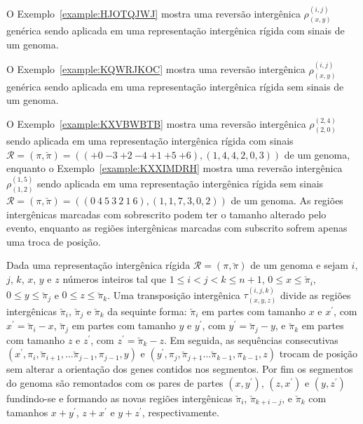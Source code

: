 O Exemplo~\ref{example:HJOTQJWJ} mostra uma reversão intergênica $\rho^{(i, j)}_{(x, y)}$ genérica sendo aplicada em uma representação intergênica rígida com sinais de um genoma.



O Exemplo~\ref{example:KQWRJKOC} mostra uma reversão intergênica $\rho^{(i, j)}_{(x, y)}$ genérica sendo aplicada em uma representação intergênica rígida sem sinais de um genoma.



O Exemplo~\ref{example:KXVBWBTB} mostra uma reversão intergênica $\rho^{(2,4)}_{(2,0)}$ sendo aplicada em uma representação intergênica rígida com sinais $\mathcal{R} = (\pi,\breve\pi) = \allowbreak(({+0}~{-3}~{+2}~{-4}~{+1}~{+5}~{+6}),\allowbreak(1,4,4,2,0,3))$ de um genoma, enquanto o Exemplo~\ref{example:KXXIMDRH} mostra uma reversão intergênica $\rho^{(1,5)}_{(1,2)}$ sendo aplicada em uma representação intergênica rígida sem sinais $\mathcal{R} = (\pi,\breve\pi) = \allowbreak(({0}~{4}~{5}~{3}~{2}~{1}~{6}),\allowbreak(1,1,7,3,0,2))$ de um genoma. As regiões intergênicas marcadas com sobrescrito podem ter o tamanho alterado pelo evento, enquanto as regiões intergênicas marcadas com subscrito sofrem apenas uma troca de posição.





\begin{definition}
Dada uma representação intergênica rígida $\mathcal{R} = (\pi,\breve\pi)$ de um genoma e sejam $i$, $j$, $k$, $x$, $y$ e $z$ números inteiros tal que $1 \le i < j < k \le n+1$, $0 \le x \le \breve\pi_i$, $0 \le y \le \breve\pi_j$ e $0 \le z \le \breve\pi_k$. Uma transposição intergênica $\tau^{(i,j,k)}_{(x,y,z)}$ divide as regiões intergênicas $\breve\pi_i$, $\breve\pi_{j}$ e $\breve\pi_k$ da sequinte forma: $\breve\pi_i$ em partes com tamanho $x$ e $x^{\prime}$, com $x^{\prime}=\breve\pi_i-x$, $\breve\pi_{j}$ em partes com tamanho $y$ e $y^{\prime}$, com $y^{\prime}=\breve\pi_{j}-y$, e $\breve\pi_{k}$ em partes com tamanho $z$ e $z^{\prime}$, com $z^{\prime}=\breve\pi_{k}-z$. Em seguida, as sequências consecutivas $(x^{\prime},\pi_i,\breve\pi_{i+1},\dots \breve \pi_{j-1},\pi_{j-1},y)$ e $(y^{\prime},\pi_j,\breve\pi_{j+1}\dots \breve\pi_{k-1},\pi_{k-1},z)$ trocam de posição sem alterar a orientação dos genes contidos nos segmentos. Por fim os segmentos do genoma são remontados com os pares de partes $(x,y^{\prime})$, $(z,x^{\prime})$ e $(y,z^{\prime})$ fundindo-se e formando as novas regiões intergênicas $\breve\pi_{i}$, $\breve\pi_{k+i-j}$, e $\breve\pi_{k}$ com tamanhos $x + y^{\prime}$, $z + x^{\prime}$ e $y + z^{\prime}$, respectivamente.
\end{definition}

